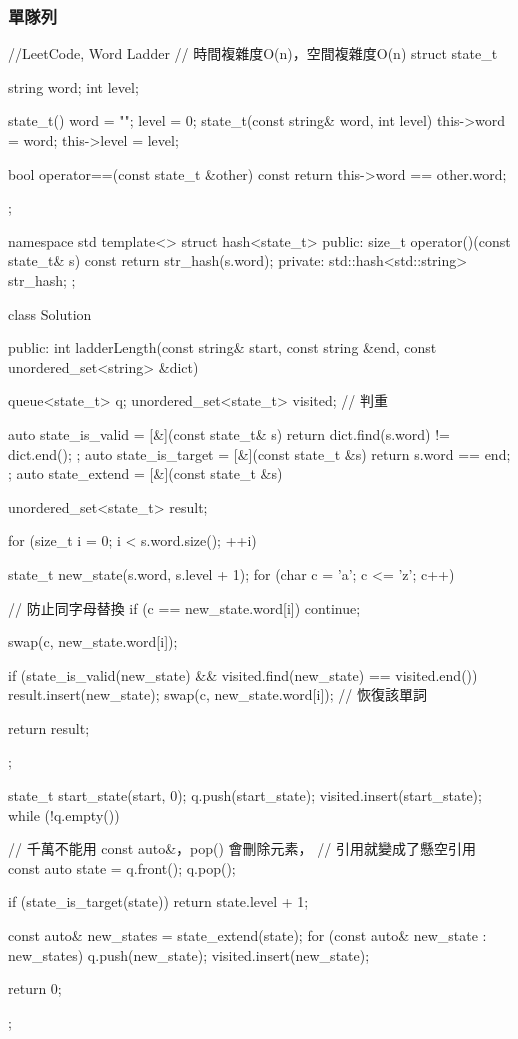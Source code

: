 \subsubsection{單隊列}
\begin{Code}
//LeetCode, Word Ladder
// 時間複雜度O(n)，空間複雜度O(n)
struct state_t {
    string word;
    int level;

    state_t() { word = ""; level = 0; }
    state_t(const string& word, int level) {
        this->word = word;
        this->level = level;
    }

    bool operator==(const state_t &other) const {
        return this->word == other.word;
    }
};

namespace std {
    template<> struct hash<state_t> {
    public:
        size_t operator()(const state_t& s) const {
            return str_hash(s.word);
        }
    private:
        std::hash<std::string> str_hash;
    };
}


class Solution {
public:
    int ladderLength(const string& start, const string &end,
            const unordered_set<string> &dict) {
        queue<state_t> q;
        unordered_set<state_t> visited;  // 判重

        auto state_is_valid = [&](const state_t& s) {
            return dict.find(s.word) != dict.end();
        };
        auto state_is_target = [&](const state_t &s) {return s.word == end; };
        auto state_extend = [&](const state_t &s) {
            unordered_set<state_t> result;

            for (size_t i = 0; i < s.word.size(); ++i) {
                state_t new_state(s.word, s.level + 1);
                for (char c = 'a'; c <= 'z'; c++) {
                    // 防止同字母替換
                    if (c == new_state.word[i]) continue;

                    swap(c, new_state.word[i]);

                    if (state_is_valid(new_state) &&
                        visited.find(new_state) == visited.end()) {
                        result.insert(new_state);
                    }
                    swap(c, new_state.word[i]); // 恢復該單詞
                }
            }

            return result;
        };

        state_t start_state(start, 0);
        q.push(start_state);
        visited.insert(start_state);
        while (!q.empty()) {
            // 千萬不能用 const auto&，pop() 會刪除元素，
            // 引用就變成了懸空引用
            const auto state = q.front();
            q.pop();

            if (state_is_target(state)) {
                return state.level + 1;
            }

            const auto& new_states = state_extend(state);
            for (const auto& new_state : new_states) {
                q.push(new_state);
                visited.insert(new_state);
            }
        }
        return 0;
    }
};
\end{Code}



